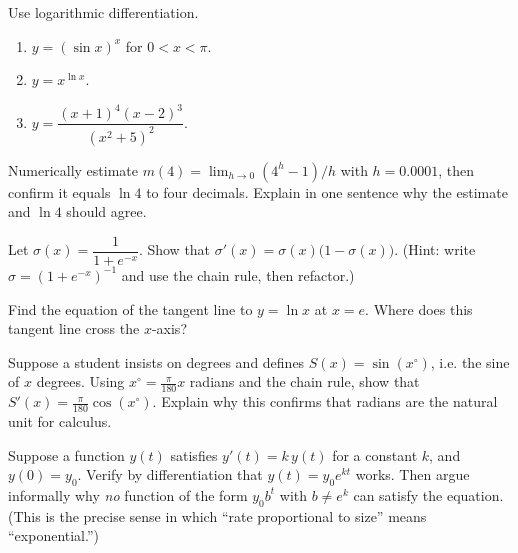 \begin{exercise}
\label{ch12:exr-logdiff}
Use logarithmic differentiation.
\begin{enumerate}[label=(\alph*)]
\item $y = (\sin x)^x$ for $0<x<\pi$.
\item $y = x^{\ln x}$.
\item $y = \dfrac{(x+1)^4 (x-2)^3}{(x^2+5)^2}$.
\end{enumerate}
\end{exercise}

\begin{exercise}
\label{ch12:exr-base}
Numerically estimate $m(4)=\lim_{h\to0}(4^h-1)/h$ with $h=0.0001$, then
confirm it equals $\ln 4$ to four decimals. Explain in one sentence why the
estimate and $\ln 4$ should agree.
\end{exercise}

\begin{exercise}
\label{ch12:exr-sigmoid}
Let $\sigma(x) = \dfrac{1}{1+e^{-x}}$. Show that
$\sigma'(x) = \sigma(x)\big(1-\sigma(x)\big)$. (Hint: write
$\sigma = (1+e^{-x})^{-1}$ and use the chain rule, then refactor.)
\end{exercise}

\begin{exercise}
\label{ch12:exr-tangent}
Find the equation of the tangent line to $y=\ln x$ at $x=e$. Where does this
tangent line cross the $x$-axis?
\end{exercise}

\begin{exercise}
\label{ch12:exr-radian}
Suppose a student insists on degrees and defines $S(x)=\sin(x^\circ)$, i.e.
the sine of $x$ degrees. Using $x^\circ = \tfrac{\pi}{180}x$ radians and the
chain rule, show that $S'(x) = \tfrac{\pi}{180}\cos(x^\circ)$. Explain why
this confirms that radians are the natural unit for calculus.
\end{exercise}

\begin{exercise}
\label{ch12:exr-proportional}
Suppose a function $y(t)$ satisfies $y'(t) = k\,y(t)$ for a constant $k$, and
$y(0)=y_0$. Verify by differentiation that $y(t) = y_0 e^{kt}$ works. Then
argue informally why \emph{no} function of the form $y_0 b^t$ with
$b\ne e^k$ can satisfy the equation. (This is the precise sense in which
``rate proportional to size'' means ``exponential.'')
\end{exercise}

